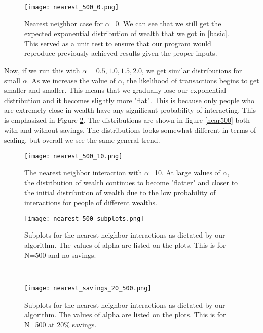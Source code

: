 \documentclass[11pt]{article}
\begin{document}
\begin{figure}[h!]
	\centering
	\texttt{[image: nearest\_500\_0.png]}
	\caption{Nearest neighbor case for $\alpha$=0. We can see that we still get the expected exponential distribution of wealth that we got in \ref{basic}. This served as a unit test to ensure that our program would reproduce previously achieved results given the proper inputs.}
	\label{alpha0}
\end{figure}

Now, if we run this with $\alpha=0.5,1.0,1.5,2.0$, we get similar distributions for small $\alpha$. As we increase the value of $\alpha$, the likelihood of transactions begins to get smaller and smaller. This means that we gradually lose our exponential distribution and it becomes slightly more "flat". This is because only people who are extremely close in wealth have any significant probability of interacting. This is emphasized in Figure \ref{bigalpha}. The distributions are shown in figure \ref{near500} both with and without savings. The distributions looks somewhat different in terms of scaling, but overall we see the same general trend. 

\begin{figure}
	\centering
	\texttt{[image: nearest\_500\_10.png]}
	\caption{The nearest neighbor interaction with $\alpha$=10. At large values of $\alpha$, the distribution of wealth continues to become "flatter" and closer to the initial distribution of wealth due to the low probability of interactions for people of different wealths.}
	\label{bigalpha}
\end{figure}

\begin{figure*}[h!]
	\centering
	\begin{subfigure}{0.45\linewidth}
		\texttt{[image: nearest\_500\_subplots.png]}
		\caption{Subplots for the nearest neighbor interactions as dictated by our algorithm. The values of alpha are listed on the plots. This is for N=500 and no savings.}
	\end{subfigure}
	~
	\begin{subfigure}{0.45\linewidth}
		\texttt{[image: nearest\_savings\_20\_500.png]}
		\caption{Subplots for the nearest neighbor interactions as dictated by our algorithm. The values of alpha are listed on the plots. This is for N=500 at 20\% savings.}
	\end{subfigure}
	\caption{The above plots show the nearest neighbor wealth distribution for N=500 with and without savings.}
	\label{near500}
\end{figure*}
\end{document}
